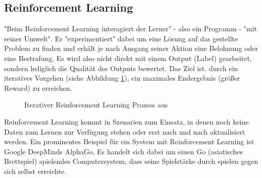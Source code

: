 \subsection{Reinforcement Learning}
"Beim Reinforcement Learning interagiert der Lerner" - also ein Programm - "mit seiner Umwelt"\citep[S.~45; eigene Übersetzung]{settles_active_2010}. Er "experimentiert" dabei um eine Lösung auf das gestellte Problem zu finden und erhält je nach Ausgang seiner Aktion eine Belohnung oder eine Bestrafung.\citep[S.~331]{kubat_introduction_2017} Es wird also nicht direkt mit einem Output (Label) gearbeitet, sondern lediglich die Qualität des Outputs bewertet. Das Ziel ist, durch ein iteratives Vorgehen (siehe Abbildung \ref{fig:reinforcementLearning}), ein maximales Endergebnis (größer Reward) zu erreichen.\citep[S.~69]{swamynathan_mastering_2017}
\begin{figure}[H]
\centering
{}
\caption{Iterativer Reinforcement Learning Prozess aus \citep[S.~25]{lison_introduction_2012}}
\label{fig:reinforcementLearning}
\end{figure}
Reinforcement Learning kommt in Szenarien zum Einsatz, in denen noch keine Daten zum Lernen zur Verfügung stehen oder erst nach und nach aktualisiert werden.\citep[S.~223]{ramasubramanian_machine_2017}\newline
Ein prominentes Beispiel für ein System mit Reinforcement Learning ist Google DeepMinds AlphaGo. Es handelt sich dabei um einen Go (asiatisches Brettspiel) spielendes Computersystem, dass seine Spielstärke durch spielen gegen sich selbst erreichte.\citep{silver_mastering_2017}

